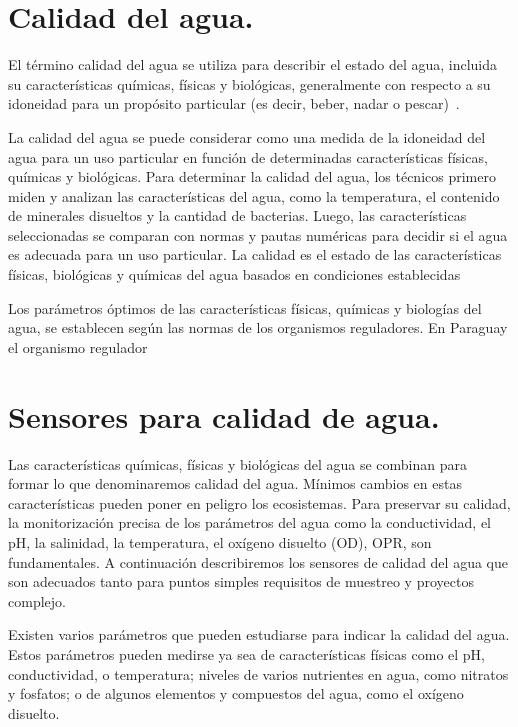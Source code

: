 \section{Calidad del agua.}

El término calidad del agua se utiliza para describir el estado del agua, incluida su características químicas, físicas y biológicas, generalmente con respecto a su idoneidad para un propósito particular (es decir, beber, nadar o pescar)~\cite{waterquality}.

La calidad del agua se puede considerar como una medida de la idoneidad del agua para un uso particular en función de determinadas características físicas, químicas y biológicas. 
Para determinar la calidad del agua, los técnicos primero miden y analizan las características del agua, como la temperatura, el contenido de minerales disueltos y la cantidad de bacterias. 
Luego, las características seleccionadas se comparan con normas y pautas numéricas para decidir si el agua es adecuada para un uso particular. 
La calidad es el estado de las características físicas, biológicas y químicas del agua basados en condiciones establecidas

Los parámetros óptimos de las características físicas, químicas y biologías del agua, se establecen según las normas de los organismos reguladores. 
En Paraguay el organismo regulador 

\section{Sensores para calidad de agua.}

Las características químicas, físicas y biológicas del agua se combinan para formar lo que denominaremos calidad del agua. 
Mínimos cambios en estas características pueden poner en peligro los ecosistemas. 
Para preservar su calidad, la monitorización precisa de los parámetros del agua como la conductividad, el pH, la salinidad, la temperatura, el oxígeno disuelto (OD), OPR, son fundamentales. 
A continuaci\'on  describiremos los sensores de calidad del agua que son adecuados tanto para puntos simples requisitos de muestreo y proyectos complejo.

Existen varios parámetros que pueden estudiarse para indicar la calidad del agua.
Estos parámetros pueden medirse ya sea de características físicas como el pH, conductividad, o temperatura; niveles de varios nutrientes en agua, como nitratos y fosfatos; o de algunos elementos y compuestos del agua, como el oxígeno disuelto. 

